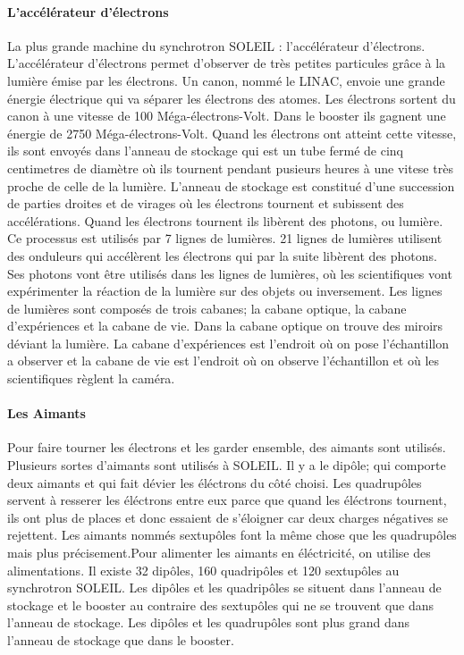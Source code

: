 			\paragraph{L'accélérateur d'électrons}
				La plus grande machine du synchrotron SOLEIL : l'accélérateur d'électrons.
				L'accélérateur d'électrons permet d'observer de très petites particules grâce à la lumière émise par les électrons.
				Un canon, nommé le LINAC, envoie une grande énergie électrique qui va séparer les électrons des atomes. Les électrons sortent du canon à une vitesse de 100 Méga-électrons-Volt.  Dans le booster ils gagnent une énergie de 2750 Méga-électrons-Volt. Quand les électrons ont atteint cette vitesse, ils sont envoyés dans l'anneau de stockage qui est un tube fermé de cinq centimetres de diamètre où ils tournent pendant pusieurs heures à une vitese très proche de celle de la lumière. L'anneau de stockage est constitué d'une succession de parties droites et de virages où les électrons tournent et subissent des accélérations. Quand les électrons tournent ils libèrent des photons, ou lumière. Ce processus est utilisés par 7 lignes de lumières. 21 lignes de lumières utilisent des onduleurs qui accélèrent les électrons qui par la suite libèrent des photons. Ses photons vont être utilisés dans les lignes de lumières, où les scientifiques vont expérimenter la réaction de la lumière sur des objets ou inversement. Les lignes de lumières sont composés de trois cabanes; la cabane optique, la cabane d'expériences et la cabane de vie. Dans la cabane optique on trouve des miroirs déviant la lumière. La cabane d'expériences est l'endroit où on pose l'échantillon a observer et la cabane de vie est l'endroit où on observe l'échantillon et où les scientifiques règlent la caméra. 
			
			\paragraph{Les Aimants}
				Pour faire tourner les électrons et les garder ensemble, des aimants sont utilisés. Plusieurs sortes d'aimants sont utilisés à SOLEIL. Il y a le dipôle; qui comporte deux aimants et qui fait dévier les éléctrons du côté choisi. Les quadrupôles servent à resserer les éléctrons entre eux parce que quand les éléctrons tournent, ils ont plus de places et donc essaient de s'éloigner car deux charges négatives se rejettent. Les aimants nommés sextupôles font la même chose que les quadrupôles mais plus précisement.Pour alimenter les aimants en éléctricité, on utilise des alimentations. Il existe 32 dipôles, 160 quadripôles et 120 sextupôles au synchrotron SOLEIL. Les dipôles et les quadripôles se situent dans l'anneau de stockage et le booster au contraire des sextupôles qui ne se trouvent que dans l'anneau de stockage. Les dipôles et les quadrupôles sont plus grand dans l'anneau de stockage que dans le booster.
			
